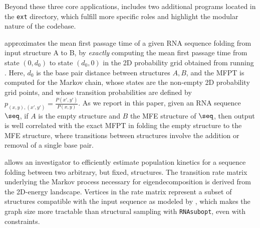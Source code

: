 Beyond these three core applications, \hermes includes two
additional programs located in the {\tt ext} directory, which fulfill
more specific roles and highlight the modular nature of the codebase.

\fftmfpt approximates the mean first passage time of a given RNA
sequence folding from input structure A to B, by {\em exactly}
computing the mean first passage time from state $(0,d_0)$ to state
$(d_0,0)$ in the 2D probability grid obtained from running
\ffttwo. Here, $d_0$ is the base pair distance between structures
$A,B$, and the MFPT is computed for the Markov chain, whose states are
the non-empty 2D probability grid points, and whose transition
probabilities are defined by $p_{(x,y),(x',y')} =
\frac{P(x',y')}{P(x,y)}$. As we report in this paper, given an RNA
sequence $\seq$, if $A$ is the empty structure and $B$ the MFE
structure of $\seq$, then \fftmfpt output is well correlated with the
exact MFPT in folding the empty structure to the MFE structure, where
transitions between structures involve the addition or removal of a
single base pair.

\ffteq allows an investigator to efficiently estimate population
kinetics for a sequence folding between two arbitrary, but fixed,
structures. The transition rate matrix underlying the Markov process
necessary for eigendecomposition is derived from the 2D-energy
landscape. Vertices in the rate matrix represent a subset of
structures compatible with the input sequence as modeled by
\ffttwo, which makes the graph size more tractable than structural
sampling with {\tt RNAsubopt}, even with constraints.


